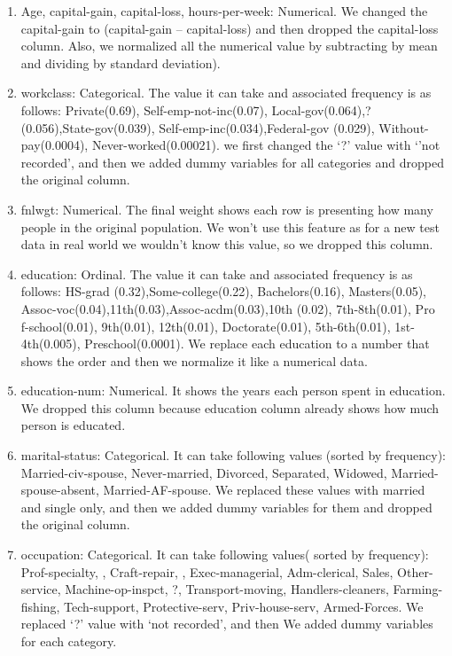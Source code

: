\documentclass[paper=a4, fontsize=11pt]{scrartcl}
\numberwithin{equation}{section}		%
\numberwithin{figure}{section}			%
\numberwithin{table}{section}				%
\begin{document}
\scriptsize{
\begin{enumerate}
    \item Age, capital-gain, capital-loss, hours-per-week: Numerical. We changed the capital-gain to (capital-gain – capital-loss) and then dropped the capital-loss column. Also, we normalized all the numerical value by subtracting by mean and dividing by standard deviation).
    \item workclass: Categorical. The value it can take and associated frequency is as follows: Private(0.69), Self-emp-not-inc(0.07), Local-gov(0.064),?                   (0.056),State-gov(0.039), Self-emp-inc(0.034),Federal-gov        (0.029), Without-pay(0.0004), Never-worked(0.00021). we first changed the ‘?’ value with ‘'not recorded', and then we added dummy variables for all categories and dropped the original column. 
    \item fnlwgt: Numerical. The final weight shows each row is presenting how many people in the original population. We won’t use this feature as for a new test data in real world we wouldn’t know this value, so we dropped this column.
    \item education: Ordinal. The value it can take and associated frequency is as follows: HS-grad (0.32),Some-college(0.22), Bachelors(0.16), Masters(0.05), Assoc-voc(0.04),11th(0.03),Assoc-acdm(0.03),10th (0.02), 7th-8th(0.01), Pro f-school(0.01), 9th(0.01), 12th(0.01), Doctorate(0.01), 5th-6th(0.01), 1st-4th(0.005), Preschool(0.0001). We replace each education to a number that shows the order and then we normalize it like a numerical data.
    \item education-num: Numerical. It shows the years each person spent in education. We dropped this column because education column already shows how much person is educated.
    \item marital-status: Categorical. It can take following values (sorted by frequency): Married-civ-spouse, Never-married, Divorced, Separated, Widowed, Married-spouse-absent, Married-AF-spouse. We replaced these values with married and single only, and then we added dummy variables for them and dropped the original column.
    \item occupation: Categorical. It can take following values( sorted by frequency): Prof-specialty, , Craft-repair, , Exec-managerial, Adm-clerical, Sales, Other-service, Machine-op-inspct, ?, Transport-moving, Handlers-cleaners, Farming-fishing, Tech-support, Protective-serv, Priv-house-serv, Armed-Forces. We replaced ‘?’ value with ‘not recorded’, and then We added dummy variables for each category.

\end{enumerate}}
\end{document}
